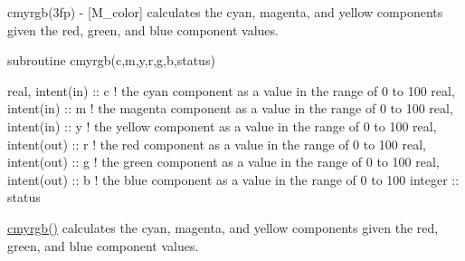 \begin{DoxyDescription}
\item[\label{_CMYRGB}%
N\+A\+ME ]cmyrgb(3fp) -\/ \mbox{[}M\+\_\+color\mbox{]} calculates the cyan, magenta, and yellow components given the red, green, and blue component values. 


\item[S\+Y\+N\+O\+P\+S\+IS ]
\begin{DoxyPre}
    subroutine cmyrgb(c,m,y,r,g,b,status)\end{DoxyPre}



\begin{DoxyPre}     real, intent(in)  :: c ! the cyan component as a value in the range of 0 to 100
     real, intent(in)  :: m ! the magenta component as a value in the range of 0 to 100
     real, intent(in)  :: y ! the yellow component as a value in the range of 0 to 100
     real, intent(out) :: r ! the red component as a value in the range of 0 to 100
     real, intent(out) :: g ! the green component as a value in the range of 0 to 100
     real, intent(out) :: b ! the blue component as a value in the range of 0 to 100
     integer           :: status
    \end{DoxyPre}
 


\item[D\+E\+S\+C\+R\+I\+P\+T\+I\+ON ]\hyperlink{namespacem__color_ab91687e87d0901874e52efe5933e3044}{cmyrgb()} calculates the cyan, magenta, and yellow components given the red, green, and blue component values.


\end{DoxyDescription}\mbox{\label{namespacem__color_a84a36043d278bc56a7148483a862dec8}} 
